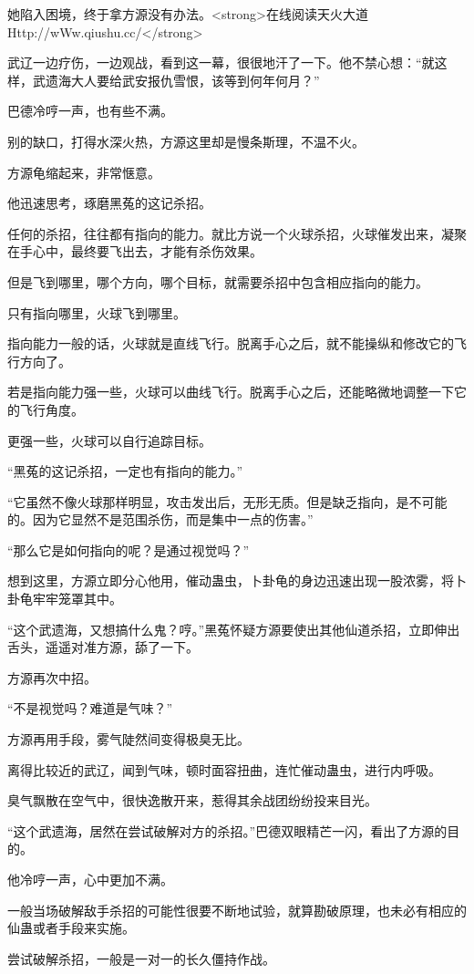 \begin{this_body}
她陷入困境，终于拿方源没有办法。<strong>在线阅读天火大道Http://wWw.qiushu.cc/</strong>

武辽一边疗伤，一边观战，看到这一幕，很很地汗了一下。他不禁心想：“就这样，武遗海大人要给武安报仇雪恨，该等到何年何月？”

巴德冷哼一声，也有些不满。

别的缺口，打得水深火热，方源这里却是慢条斯理，不温不火。

方源龟缩起来，非常惬意。

他迅速思考，琢磨黑菟的这记杀招。

任何的杀招，往往都有指向的能力。就比方说一个火球杀招，火球催发出来，凝聚在手心中，最终要飞出去，才能有杀伤效果。

但是飞到哪里，哪个方向，哪个目标，就需要杀招中包含相应指向的能力。

只有指向哪里，火球飞到哪里。

指向能力一般的话，火球就是直线飞行。脱离手心之后，就不能操纵和修改它的飞行方向了。

若是指向能力强一些，火球可以曲线飞行。脱离手心之后，还能略微地调整一下它的飞行角度。

更强一些，火球可以自行追踪目标。

“黑菟的这记杀招，一定也有指向的能力。”

“它虽然不像火球那样明显，攻击发出后，无形无质。但是缺乏指向，是不可能的。因为它显然不是范围杀伤，而是集中一点的伤害。”

“那么它是如何指向的呢？是通过视觉吗？”

想到这里，方源立即分心他用，催动蛊虫，卜卦龟的身边迅速出现一股浓雾，将卜卦龟牢牢笼罩其中。

“这个武遗海，又想搞什么鬼？哼。”黑菟怀疑方源要使出其他仙道杀招，立即伸出舌头，遥遥对准方源，舔了一下。

方源再次中招。

“不是视觉吗？难道是气味？”

方源再用手段，雾气陡然间变得极臭无比。

离得比较近的武辽，闻到气味，顿时面容扭曲，连忙催动蛊虫，进行内呼吸。

臭气飘散在空气中，很快逸散开来，惹得其余战团纷纷投来目光。

“这个武遗海，居然在尝试破解对方的杀招。”巴德双眼精芒一闪，看出了方源的目的。

他冷哼一声，心中更加不满。

一般当场破解敌手杀招的可能性很要不断地试验，就算勘破原理，也未必有相应的仙蛊或者手段来实施。

尝试破解杀招，一般是一对一的长久僵持作战。


\end{this_body}
